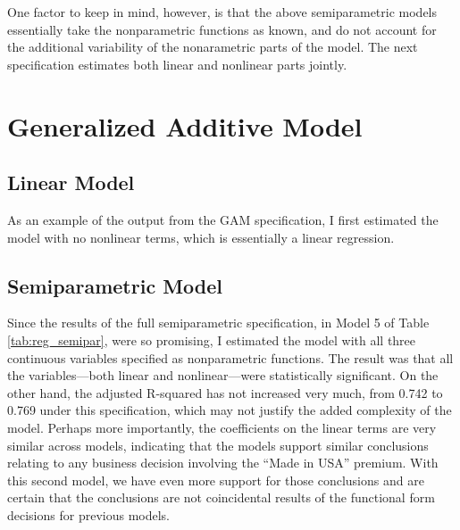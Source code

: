 \documentclass[11pt]{paper}
\begin{document}
One factor to keep in mind, however,
is that the above semiparametric models
essentially take the nonparametric functions as known, 
and do not account for the additional variability of
the nonarametric parts of the model.
The next specification estimates both linear 
and nonlinear parts jointly. 




\pagebreak
\section{Generalized Additive Model}

\subsection{Linear Model}

As an example of the output from the GAM specification, 
I first estimated the model with no nonlinear terms, 
which is essentially a linear regression. 



\pagebreak
\subsection{Semiparametric Model}


Since the results of the full semiparametric specification,
in Model 5 of Table \ref{tab:reg_semipar},
were so promising, 
I estimated the model with all three continuous variables specified as nonparametric functions. 
The result was that 
all the variables---both linear and nonlinear---were 
statistically significant. 
On the other hand, 
the adjusted R-squared has not increased very much, 
from 0.742 to 0.769 under this specification, 
which may not justify the added complexity of the model.
Perhaps more importantly, the coefficients on the 
linear terms are very similar across models, 
indicating that the models support similar conclusions relating to any business decision involving
the ``Made in USA'' premium. 
With this second model, we have even more support for those conclusions
and are certain that the conclusions are not 
coincidental results of the
functional form decisions for previous models.


 

\end{document}
